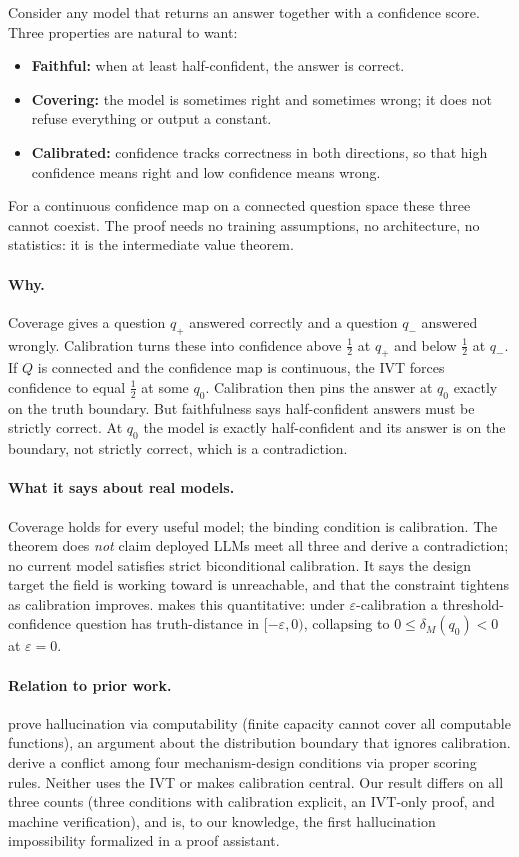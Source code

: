 \documentclass[10pt]{article}
\begin{document}
Consider any model that returns an answer together with a confidence score.
Three properties are natural to want:
\begin{itemize}[nosep,leftmargin=1.5em]
\item \textbf{Faithful:} when at least half-confident, the answer is correct.
\item \textbf{Covering:} the model is sometimes right and sometimes wrong; it
  does not refuse everything or output a constant.
\item \textbf{Calibrated:} confidence tracks correctness in both directions,
  so that high confidence means right and low confidence means wrong.
\end{itemize}
For a continuous confidence map on a connected question space these three
cannot coexist. The proof needs no training assumptions, no architecture, no
statistics: it is the intermediate value theorem.

\paragraph{Why.}
Coverage gives a question $q_+$ answered correctly and a question $q_-$
answered wrongly. Calibration turns these into confidence above $\tfrac12$ at
$q_+$ and below $\tfrac12$ at $q_-$. If $Q$ is connected and the confidence
map is continuous, the IVT forces confidence to equal $\tfrac12$ at some
$q_0$. Calibration then pins the answer at $q_0$ exactly on the truth
boundary. But faithfulness says half-confident answers must be strictly
correct. At $q_0$ the model is exactly half-confident and its answer is on the
boundary, not strictly correct, which is a contradiction.

\paragraph{What it says about real models.}
Coverage holds for every useful model; the binding condition is calibration.
The theorem does \emph{not} claim deployed LLMs meet all three and derive a
contradiction; no current model satisfies strict biconditional calibration.
It says the design target the field is working toward is unreachable, and that
the constraint tightens as calibration improves.  makes
this quantitative: under $\varepsilon$-calibration a threshold-confidence
question has truth-distance in $[-\varepsilon,0)$, collapsing to
$0\le\delta_M(q_0)<0$ at $\varepsilon=0$.

\paragraph{Relation to prior work.}
\citet{xu2024hallucination} prove hallucination via computability (finite
capacity cannot cover all computable functions), an argument about the
distribution boundary that ignores calibration.
\citet{karpowicz2025impossibility} derive a conflict among four
mechanism-design conditions via proper scoring rules. Neither uses the IVT or
makes calibration central. Our result differs on all three counts (three
conditions with calibration explicit, an IVT-only proof, and machine
verification), and is, to our knowledge, the first hallucination impossibility
formalized in a proof assistant.
\end{document}
